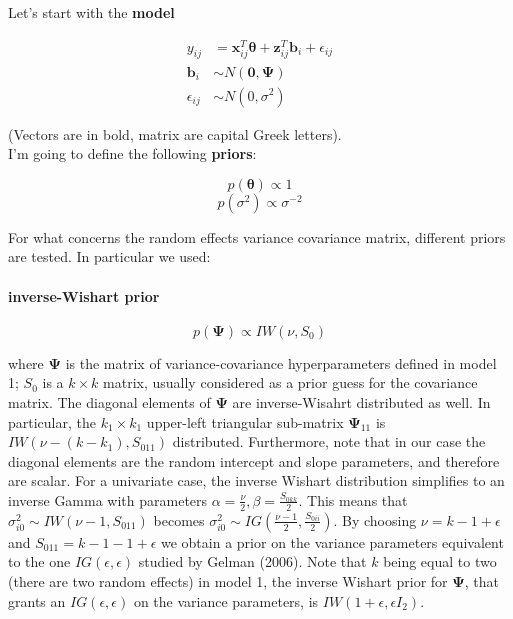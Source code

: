 \documentclass[a4paper]{article}
\begin{document}
Let's start with the \textbf{model}

\begin{equation}
 \begin{split}
	y_{ij}& = \bm{x}^{T}_{ij} \bm{\theta} + \bm{z}^{T}_{ij}\bm{b}_i + \epsilon_{ij}\\
	\bm{b}_i& \sim N(\bm{0}, \bm{\Psi})\\
	\epsilon_{ij}& \sim N(0, \sigma^2)
 \end{split}
\end{equation}

(Vectors are in bold, matrix are capital Greek letters).\\
I'm going to define the following \textbf{priors}:

\begin{equation}
p(\bm{\theta}) \propto 1
\end{equation}
\begin{equation}
p(\sigma^2) \propto \sigma^{-2}
\end{equation}

For what concerns the random effects variance covariance matrix, 
different priors are tested. In particular we used:

\paragraph{inverse-Wishart prior}

\begin{equation}
p(\bm{\Psi}) \propto IW(\nu, S_{0})
\end{equation}	

where $\bm{\Psi}$ is the matrix of variance-covariance hyperparameters
defined in model 1; $S_{0}$ is a $k \times k$ matrix, usually considered
as a prior guess for the covariance matrix. The diagonal elements of $\bm{\Psi}$
are inverse-Wisahrt distributed as well. In particular, the $k_1 \times 
k_1$ upper-left triangular sub-matrix $\bm{\Psi}_{11}$ is $IW(\nu-(k-k_1), S_{011})$
distributed.  Furthermore, note that in our case the diagonal elements
are the random intercept and slope parameters, and therefore are scalar.  
For a univariate case, the inverse Wishart distribution simplifies 
to an inverse Gamma with parameters $\alpha=\frac{\nu}{2}, \beta = 
\frac{S_{0kk}}{2}$. This means that $\sigma_{i0}^2 \sim IW(\nu - 1, S_{011})$
becomes $\sigma_{i0}^{2} \sim IG(\frac{\nu-1}{2},\frac{S_{0ii}}{2})$.
By choosing $\nu = k - 1 + \epsilon$ and $S_{011} = k - 1 - 1 + \epsilon$
we obtain a prior on the variance parameters equivalent to the one 
$IG(\epsilon, \epsilon)$ studied by Gelman (2006). Note that $k$ being 
equal to two (there are two random effects) in model 1, the inverse 
Wishart prior for $\bm{\Psi}$, that grants an $IG(\epsilon, \epsilon)$
on the variance parameters, is $IW(1+\epsilon, \epsilon I_2)$.
\end{document}
